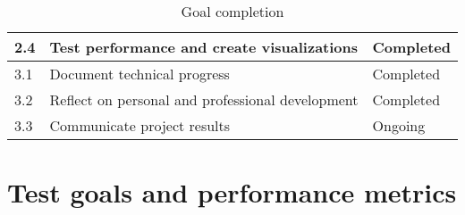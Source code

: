 \begin{table}[ht]
\begin{adjustbox}{angle=0}
\begin{tabular}{|l|l|l|}
	2.4    & Test performance and create visualizations                                                                                                                                               & \cellcolor[HTML]{34FF34}Completed   \\ \hline
	3.1    & Document technical progress                                                                                                                                                              & \cellcolor[HTML]{34FF34}Completed   \\ \hline
	3.2    & Reflect on personal and professional development                                                                                                                                         & \cellcolor[HTML]{34FF34}Completed   \\ \hline
	3.3    & Communicate project results                                                                                                                                                              & \cellcolor[HTML]{F8FF00}Ongoing     \\ \hline
\end{tabular}
\end{adjustbox}
\caption{Goal completion}
\label{tab:goal_com}
\end{table}



\section{Test goals and performance metrics}


